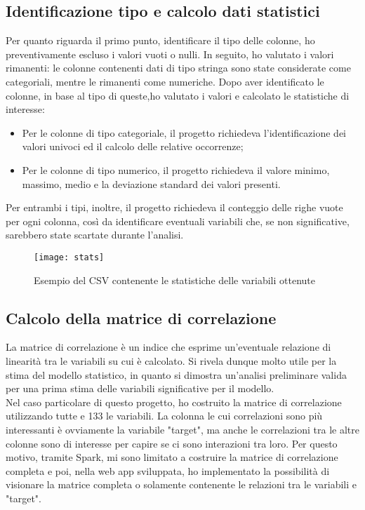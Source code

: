 \subsection{Identificazione tipo e calcolo dati statistici}
Per quanto riguarda il primo punto, identificare il tipo delle colonne, ho preventivamente escluso i valori vuoti o nulli.
In seguito, ho valutato i valori rimanenti: le colonne contenenti dati di tipo stringa sono state considerate come categoriali, mentre le rimanenti come numeriche. 
Dopo aver identificato le colonne, in base al tipo di queste,ho valutato i valori e calcolato le statistiche di interesse:
\begin{itemize}
	\item Per le colonne di tipo categoriale, il progetto richiedeva l'identificazione dei valori univoci ed il calcolo delle relative occorrenze;
	\item Per le colonne di tipo numerico, il progetto richiedeva il valore minimo, massimo, medio e la deviazione standard dei valori presenti.
\end{itemize}
Per entrambi i tipi, inoltre, il progetto richiedeva il conteggio delle righe vuote per ogni colonna, così da identificare eventuali variabili che, se non significative, sarebbero state scartate durante l'analisi.
\clearpage
\begin{figure}[!h]
	\centering
	\texttt{[image: stats]}
	\caption{Esempio del CSV contenente le statistiche delle variabili ottenute}
\end{figure}

\subsection{Calcolo della matrice di correlazione}
La matrice di correlazione è un indice che esprime un'eventuale relazione di linearità tra le variabili su cui è calcolato. Si rivela dunque molto utile per la stima del modello statistico, in quanto si dimostra un'analisi preliminare valida per una prima stima delle variabili significative per il modello.\\
Nel caso particolare di questo progetto, ho costruito la matrice di correlazione utilizzando tutte e 133 le variabili. La colonna le cui correlazioni sono più interessanti è ovviamente la variabile "target", ma anche le correlazioni tra le altre colonne sono di interesse per capire se ci sono interazioni tra loro. Per questo motivo, tramite Spark, mi sono limitato a costruire la matrice di correlazione completa e poi, nella \gls{web app} sviluppata, ho implementato la possibilità di visionare la matrice completa o solamente contenente le relazioni tra le variabili e "target".

